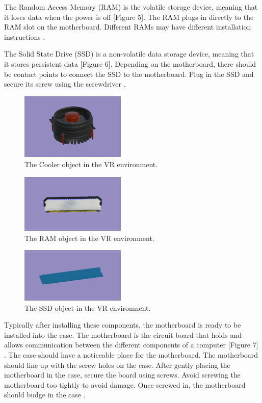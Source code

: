 \documentclass[10pt,twocolumn]{article}
\begin{document}
\par The Random Access Memory (RAM) is the volatile storage device, meaning that it loses data when the power is off [Figure 5]. The RAM plugs in directly to the RAM slot on the motherboard. Different RAMs may have different installation instructions \cite{Fisher2021EverythingYouNeed}. 

\par The Solid State Drive (SSD) is a non-volatile data storage device, meaning that it stores persistent data [Figure 6]. Depending on the motherboard, there should be contact points to connect the SSD to the motherboard. Plug in the SSD and secure its screw using the screwdriver \cite{Fisher2021EverythingYouNeed}. 

\begin{figure}
    \centering
    \includegraphics[width=5cm]{images/Cooler.png}
    \caption{The Cooler object in the VR environment.}
\end{figure}

\begin{figure}
    \centering
    \includegraphics[width=5cm]{images/RAM.png}
    \caption{The RAM object in the VR environment.}
\end{figure}

\begin{figure}
    \centering
    \includegraphics[width=5cm]{images/SSD.png}
    \caption{The SSD object in the VR environment.}
\end{figure}

\par Typically after installing these components, the motherboard is ready to be installed into the case. The motherboard is the circuit board that holds and allows communication between the different components of a computer [Figure 7] \cite{Fisher2021EverythingYouNeed}. The case should have a noticeable place for the motherboard. The motherboard should line up with the screw holes on the case. After gently placing the motherboard in the case, secure the board using screws. Avoid screwing the motherboard too tightly to avoid damage. Once screwed in, the motherboard should budge in the case \cite{Sample2021HowToAssemble}. 
\end{document}
